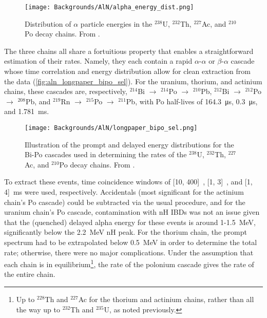\documentclass[../thesis.tex]{subfiles}
\begin{document}
\begin{figure}[ht]
  \texttt{[image: Backgrounds/AlN/alpha\_energy\_dist.png]}
  \caption{Distribution of $\alpha$ particle energies in the $^{238}$U, $^{232}$Th, $^{227}$Ac, and $^{210}$Po decay chains. From \cite{Zhao_2014}.}
  \label{fig:aln_alpha_energy_dist}
\end{figure}

The three chains all share a fortuitious property that enables a straightforward estimation of their rates. Namely, they each contain a rapid $\alpha$-$\alpha$ or $\beta$-$\alpha$ cascade whose time correlation and energy distribution allow for clean extraction from the data (\autoref{fig:aln_longpaper_bipo_sel}). For the uranium, thorium, and actinium chains, these cascades are, respectively, $^{214}$Bi $\to$ $^{214}$Po $\to$ $^{210}$Pb, $^{212}$Bi $\to$ $^{212}$Po $\to$ $^{208}$Pb, and $^{219}$Rn $\to$ $^{215}$Po $\to$ $^{211}$Pb, with Po half-lives of \SI{164.3}{\micro s}, \SI{0.3}{\micro s}, and \SI{1.781}{ms}.

\begin{figure}[ht]
  \texttt{[image: Backgrounds/AlN/longpaper\_bipo\_sel.png]}
  \caption{Illustration of the prompt and delayed energy distributions for the Bi-Po cascades used in determining the rates of the $^{238}$U, $^{232}$Th, $^{227}$Ac, and $^{210}$Po decay chains. From \cite{An_2017}.}
  \label{fig:aln_longpaper_bipo_sel}
\end{figure}

To extract these events, time coincidence windows of [10, 400]~\us, [1, 3]~\us, and [1, 4]~ms were used, respectively. Accidentals (most significant for the actinium chain's Po cascade) could be subtracted via the usual procedure,
and for the uranium chain's Po cascade, contamination with nH IBDs was not an issue given that the (quenched) delayed alpha energy for these events is around 1-1.5~MeV, significantly below the 2.2~MeV nH peak. For the thorium chain, the prompt spectrum had to be extrapolated below 0.5~MeV in order to determine the total rate; otherwise, there were no major complications. Under the assumption that each chain is in equilibrium\footnote{Up to $^{228}$Th and $^{227}$Ac for the thorium and actinium chains, rather than all the way up to $^{232}$Th and $^{235}$U, as noted previously.}, the rate of the polonium cascade gives the rate of the entire chain.
\end{document}
